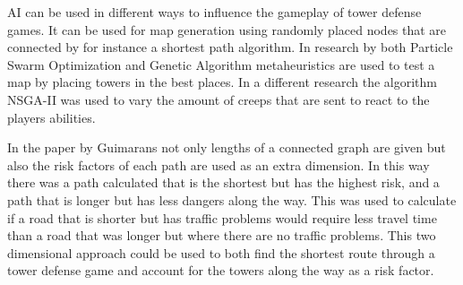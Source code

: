 AI can be used in different ways to influence the gameplay of tower defense games. It can be used for map generation using randomly placed nodes that are connected by for instance a shortest path algorithm. \cite{avery2011computational} In research by \cite{huo2009application}  both Particle Swarm Optimization and Genetic Algorithm metaheuristics are used to test a map by placing towers in the best places\cite{huo2009application}.  In a different research the algorithm NSGA-II was used to vary the amount of creeps that are sent to react to the players abilities\cite{ariyadicreep}. 

In the paper by Guimarans\cite{guimarans2016multi} not only lengths of a connected graph are given but also the risk factors of each path are used as an extra dimension. In this way there was a path calculated that is the shortest but has the highest risk, and a path that is longer but has less dangers along the way. This was used to calculate if a road that is shorter but has traffic problems would require less travel time than a road that was longer but where there are no traffic problems\cite{guimarans2016multi}.  This two dimensional approach could be used to both find the shortest route through a tower defense game and account for the towers along the way as a risk factor. 





